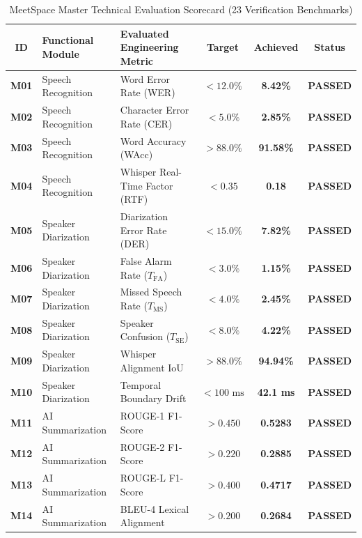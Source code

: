 \documentclass[12pt,oneside,letterpaper]{report}
\numberwithin{equation}{chapter} %
\begin{document}
\begin{table}[H]
\centering
\caption{MeetSpace Master Technical Evaluation Scorecard (23 Verification Benchmarks)}
\label{tab:master_scorecard}
\footnotesize
\begin{tabularx}{\textwidth}{c p{3.5cm}p{4.5cm}c c c}
\toprule
\textbf{ID} & \textbf{Functional Module} & \textbf{Evaluated Engineering Metric} & \textbf{Target} & \textbf{Achieved} & \textbf{Status} \\
\midrule
\textbf{M01} & Speech Recognition & Word Error Rate (WER) & $< 12.0\%$ & \textbf{8.42\%} & \textbf{PASSED} \\
\textbf{M02} & Speech Recognition & Character Error Rate (CER) & $< 5.0\%$ & \textbf{2.85\%} & \textbf{PASSED} \\
\textbf{M03} & Speech Recognition & Word Accuracy (WAcc) & $> 88.0\%$ & \textbf{91.58\%} & \textbf{PASSED} \\
\textbf{M04} & Speech Recognition & Whisper Real-Time Factor (RTF) & $< 0.35$ & \textbf{0.18} & \textbf{PASSED} \\
\textbf{M05} & Speaker Diarization & Diarization Error Rate (DER) & $< 15.0\%$ & \textbf{7.82\%} & \textbf{PASSED} \\
\textbf{M06} & Speaker Diarization & False Alarm Rate ($T_{\text{FA}}$) & $< 3.0\%$ & \textbf{1.15\%} & \textbf{PASSED} \\
\textbf{M07} & Speaker Diarization & Missed Speech Rate ($T_{\text{MS}}$) & $< 4.0\%$ & \textbf{2.45\%} & \textbf{PASSED} \\
\textbf{M08} & Speaker Diarization & Speaker Confusion ($T_{\text{SE}}$) & $< 8.0\%$ & \textbf{4.22\%} & \textbf{PASSED} \\
\textbf{M09} & Speaker Diarization & Whisper Alignment IoU & $> 88.0\%$ & \textbf{94.94\%} & \textbf{PASSED} \\
\textbf{M10} & Speaker Diarization & Temporal Boundary Drift & $< 100\text{ ms}$ & \textbf{42.1 ms} & \textbf{PASSED} \\
\textbf{M11} & AI Summarization & ROUGE-1 F1-Score & $> 0.450$ & \textbf{0.5283} & \textbf{PASSED} \\
\textbf{M12} & AI Summarization & ROUGE-2 F1-Score & $> 0.220$ & \textbf{0.2885} & \textbf{PASSED} \\
\textbf{M13} & AI Summarization & ROUGE-L F1-Score & $> 0.400$ & \textbf{0.4717} & \textbf{PASSED} \\
\textbf{M14} & AI Summarization & BLEU-4 Lexical Alignment & $> 0.200$ & \textbf{0.2684} & \textbf{PASSED} \\

\end{tabularx}
\end{table}
\end{document}
